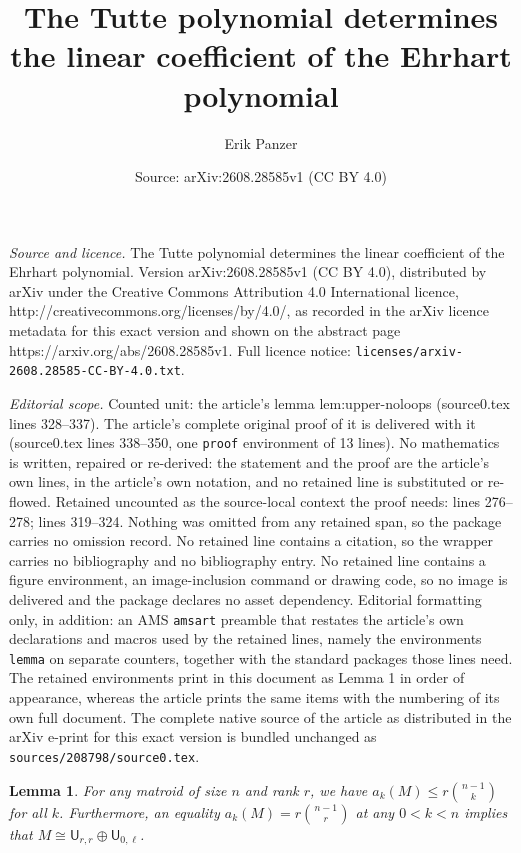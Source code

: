 \documentclass[10pt,a4paper]{amsart}
\title{\vspace{-10mm}The Tutte polynomial determines the linear coefficient of the Ehrhart polynomial}
\author{Erik Panzer}
\date{Source: arXiv:2608.28585v1 (CC BY 4.0)}
\newtheorem{lemma}{Lemma}
\newcommand{\UM}[2]{\mathsf{U}_{#2,#1}} %
\begin{document}
\maketitle

\noindent\emph{Source and licence.} \vspace{-10mm}The Tutte polynomial determines the linear coefficient of the Ehrhart polynomial. Version arXiv:2608.28585v1 (CC BY 4.0), distributed by arXiv under the Creative Commons Attribution 4.0 International licence, http://creativecommons.org/licenses/by/4.0/, as recorded in the arXiv licence metadata for this exact version and shown on the abstract page https://arxiv.org/abs/2608.28585v1. Full licence notice: \texttt{licenses/arxiv-2608.28585-CC-BY-4.0.txt}.\par\smallskip

\noindent\textit{Editorial scope.} Counted unit: the article's lemma lem:upper-noloops (source0.tex lines 328--337). The article's complete original proof of it is delivered with it (source0.tex lines 338--350, one \texttt{proof} environment of 13 lines). No mathematics is written, repaired or re-derived: the statement and the proof are the article's own lines, in the article's own notation, and no retained line is substituted or re-flowed.  Retained uncounted as the source-local context the proof needs: lines 276--278; lines 319--324.  Nothing was omitted from any retained span, so the package carries no omission record.  No retained line contains a citation, so the wrapper carries no bibliography and no bibliography entry.  No retained line contains a figure environment, an image-inclusion command or drawing code, so no image is delivered and the package declares no asset dependency.  Editorial formatting only, in addition: an AMS \texttt{amsart} preamble that restates the article's own declarations and macros used by the retained lines, namely the environments \texttt{lemma} on separate counters, together with the standard packages those lines need.  The retained environments print in this document as Lemma 1 in order of appearance, whereas the article prints the same items with the numbering of its own full document.  The complete native source of the article as distributed in the arXiv e-print for this exact version is bundled unchanged as \texttt{sources/208798/source0.tex}.
\begin{lemma}\label{lem:ak-upper}
    For any matroid of size $n$ and rank $r$, we have $a_k(M)\leq r\binom{n-1}{k}$ for all $k$. Furthermore, an equality $a_k(M)=r\binom{n-1}{r}$ at any $0<k<n$ implies that $M\cong \UM{r}{r}\oplus\UM{\ell}{0}$.
\end{lemma}
\end{document}
